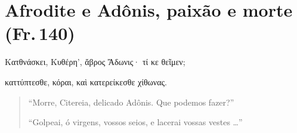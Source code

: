 \pagebreak
\section{Afrodite e Adônis, paixão e morte (Fr.\,140)}

\begin{gkverse}
Κατθνάσκει, Κυθέρη’, ἄβρος Ἄδωνις· τί κε θεῖμεν;

καττύπτεσθε, κόραι, καὶ κατερείκεσθε χίθωνας.
\end{gkverse}

\begin{verse}
``Morre, Citereia, delicado Adônis. Que podemos fazer?''

``Golpeai, ó virgens, vossos seios, e lacerai vossas vestes \ldots{}''
\end{verse}

\medskip

